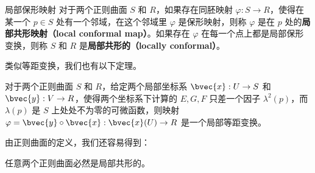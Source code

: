 \begin{definition}{局部保形映射}
对于两个正则曲面 $S$ 和 $R$，如果存在同胚映射 $\varphi:S\to R$，使得在某一个 $p\in S$ 处有一个邻域，在这个邻域里 $\varphi$ 是保形映射，则称 $\varphi$ 是在 $p$ 处的\textbf{局部共形映射（local conformal map）}。如果存在 $\varphi$ 在每一个点上都是局部保形变换，则称 $S$ 和 $R$ 是\textbf{局部共形的（locally conformal）}。
\end{definition}

类似等距变换，我们也有以下定理。

\begin{theorem}{}
对于两个正则曲面 $S$ 和 $R$，给定两个局部坐标系 $\bvec{x}:U\to S$ 和 $\bvec{y}:V\to R$，使得两个坐标系下计算的 $E, G, F$ 只差一个因子 $\lambda^2(p)$，而 $\lambda(p)$ 是 $S$ 上处处不为零的可微函数，则映射 $\varphi=\bvec{y}\circ\bvec{x}:\bvec{x}(U)\to R$ 是一个局部等距变换。
\end{theorem}

由正则曲面的定义，我们还容易得到：

\begin{theorem}{}
任意两个正则曲面必然是局部共形的。
\end{theorem}



